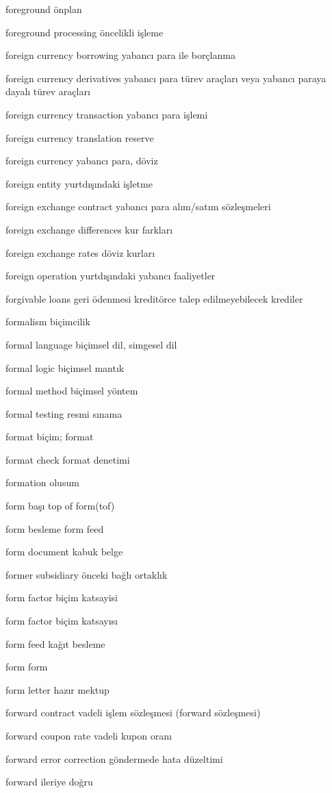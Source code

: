 \documentclass[12pt,fleqn]{article}\usepackage{../../common}
\begin{document}
foreground önplan

foreground processing öncelikli işleme

foreign currency borrowing yabancı para ile borçlanma

foreign currency derivatives yabancı para türev araçları veya yabancı paraya dayalı türev araçları

foreign currency transaction yabancı para işlemi

foreign currency translation reserve

foreign currency yabancı para, döviz

foreign entity yurtdışındaki işletme

foreign exchange contract yabancı para alım/satım sözleşmeleri

foreign exchange differences kur farkları

foreign exchange rates döviz kurları

foreign operation yurtdışındaki yabancı faaliyetler

forgivable loans geri ödenmesi kreditörce talep edilmeyebilecek krediler

formalism biçimcilik

formal language biçimsel dil, simgesel dil

formal logic biçimsel mantık

formal method biçimsel yöntem

formal testing resmi sınama

format biçim; format

format check format denetimi

formation olusum

form başı top of form(tof)

form besleme form feed

form document kabuk belge

former subsidiary önceki bağlı ortaklık

form factor biçim katsayisi

form factor biçim katsayısı

form feed kağıt besleme

form form

form letter hazır mektup

forward contract vadeli işlem sözleşmesi (forward sözleşmesi)

forward coupon rate vadeli kupon oranı

forward error correction göndermede hata düzeltimi

forward ileriye doğru
\end{document}
